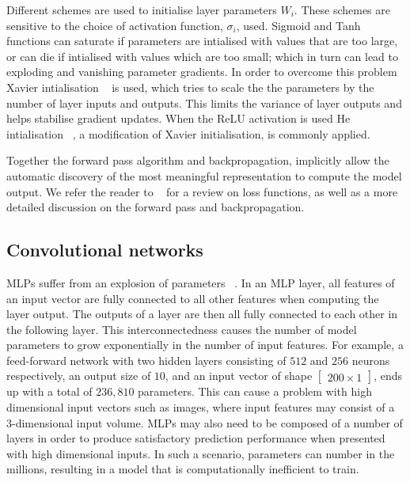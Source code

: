 \medskip
\noindent Different schemes are used to initialise layer parameters $ W_i $. These schemes are sensitive to the choice of activation function, $ \sigma_i $, used. Sigmoid and Tanh functions can saturate if parameters are intialised with values that are too large, or can die if intialised with values which are too small; which in turn can lead to exploding and vanishing parameter gradients. In order to overcome this problem Xavier intialisation \unskip ~\citep{glorot2010understanding} is used, which tries to scale the the parameters by the number of layer inputs and outputs. This limits the variance of layer outputs and helps stabilise gradient updates. When the ReLU activation is used He intialisation \unskip ~\citep{he2015delving}, a modification of Xavier initialisation, is commonly applied. \par

\noindent Together the forward pass algorithm and backpropagation, implicitly allow the automatic discovery of the most meaningful representation to compute the model output. We refer the reader to \unskip ~\citep{Goodfellow-et-al-2016} for a review on loss functions, as well as a more detailed discussion on the forward pass and backpropagation. 


\subsection{Convolutional networks}

MLPs suffer from an explosion of parameters  ~\citep{krizhevsky2012imagenet}. In an MLP layer, all features of an input vector are fully connected to all other features when computing the layer output. The outputs of a layer are then all fully connected to each other in the following layer. This interconnectedness causes the number of model parameters to grow exponentially in the number of input features. For example, a feed-forward network with two hidden layers consisting of $512$ and $256$ neurons respectively, an output size of $10$, and an input vector of shape $\left [ \begin{matrix} 200 \times 1 \end{matrix} \right] $, ends up with a total of $236,810$ parameters. This can cause a problem with high dimensional input vectors such as images, where input features may consist of a 3-dimensional input volume. MLPs may also need to be composed of a number of layers in order to produce satisfactory prediction performance when presented with high dimensional inputs. In such a scenario, parameters can number in the millions, resulting in a model that is computationally inefficient to train. \par

